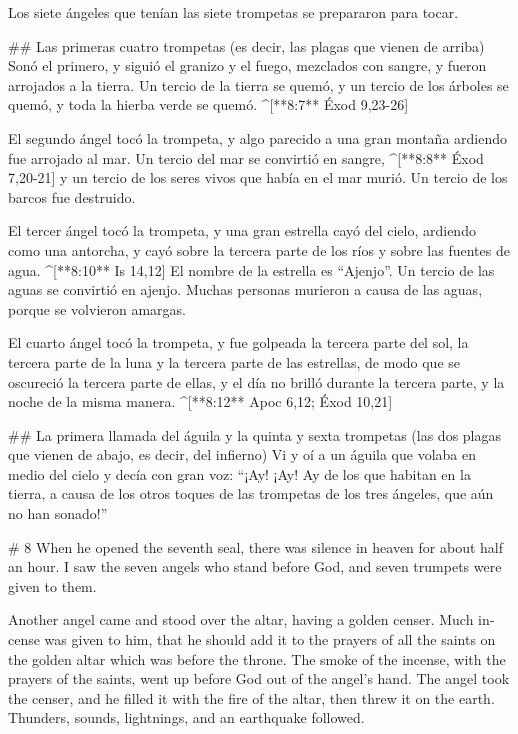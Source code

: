 \begin{paracols}{2}
 Los siete ángeles que tenían las siete trompetas se prepararon para tocar.

## Las primeras cuatro trompetas (es decir, las plagas que vienen de arriba)
 Sonó el primero, y siguió el granizo y el fuego, mezclados con sangre, y fueron arrojados a la tierra. Un tercio de la tierra se quemó, y un tercio de los árboles se quemó, y toda la hierba verde se quemó. ^[**8:7** Éxod 9,23-26]

 El segundo ángel tocó la trompeta, y algo parecido a una gran montaña ardiendo fue arrojado al mar. Un tercio del mar se convirtió en sangre, ^[**8:8** Éxod 7,20-21]  y un tercio de los seres vivos que había en el mar murió. Un tercio de los barcos fue destruido.

 El tercer ángel tocó la trompeta, y una gran estrella cayó del cielo, ardiendo como una antorcha, y cayó sobre la tercera parte de los ríos y sobre las fuentes de agua. ^[**8:10** Is 14,12]  El nombre de la estrella es “Ajenjo”. Un tercio de las aguas se convirtió en ajenjo. Muchas personas murieron a causa de las aguas, porque se volvieron amargas.

 El cuarto ángel tocó la trompeta, y fue golpeada la tercera parte del sol, la tercera parte de la luna y la tercera parte de las estrellas, de modo que se oscureció la tercera parte de ellas, y el día no brilló durante la tercera parte, y la noche de la misma manera. ^[**8:12** Apoc 6,12; Éxod 10,21]

## La primera llamada del águila y la quinta y sexta trompetas (las dos plagas que vienen de abajo, es decir, del infierno)
 Vi y oí a un águila que volaba en medio del cielo y decía con gran voz: “¡Ay! ¡Ay! Ay de los que habitan en la tierra, a causa de los otros toques de las trompetas de los tres ángeles, que aún no han sonado!”

\switchcolumn
\begin{english}

# 8
 When he opened the seventh seal, there was silence in heaven for about half an hour.  I saw the seven angels who stand before God, and seven trumpets were given to them. 

 Another angel came and stood over the altar, having a golden censer. Much incense was given to him, that he should add it to the prayers of all the saints on the golden altar which was before the throne.  The smoke of the incense, with the prayers of the saints, went up before God out of the angel’s hand.  The angel took the censer, and he filled it with the fire of the altar, then threw it on the earth. Thunders, sounds, lightnings, and an earthquake followed. 


\end{english}
\end{paracols}
